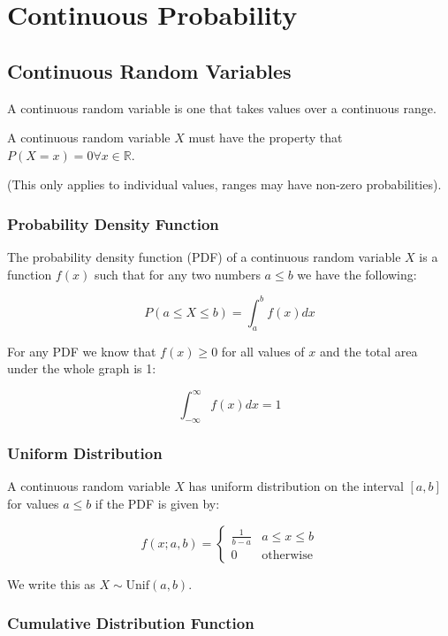 \section{Continuous Probability}

\subsection*{Continuous Random Variables}

A continuous random variable is one that takes values over a continuous range.

A continuous random variable $X$ must have the property that $P(X=x)=0 \forall x \in \mathbb{R}$.

(This only applies to individual values, ranges may have non-zero probabilities).

\subsubsection*{Probability Density Function}

The probability density function (PDF) of a continuous random variable $X$ is a function $f(x)$ such that for any two numbers $a\leq b$ we have the following:

$$ P(a \leq X \leq b) = \int_a^b f(x) dx $$

For any PDF we know that $f(x) \geq 0$ for all values of $x$ and the total area under the whole graph is 1:

$$ \int_{-\infty}^{\infty} f(x) dx = 1 $$

\subsubsection*{Uniform Distribution}

A continuous random variable $X$ has uniform distribution on the interval $[a,b]$ for values $a \leq b$ if the PDF is given by:

$$ f(x; a,b) = \begin{cases} \frac{1}{b-a} & a \leq x \leq b \\ 0 & \text{otherwise} \end{cases} $$

We write this as $X \sim \text{Unif}(a,b)$.

\subsubsection*{Cumulative Distribution Function}


